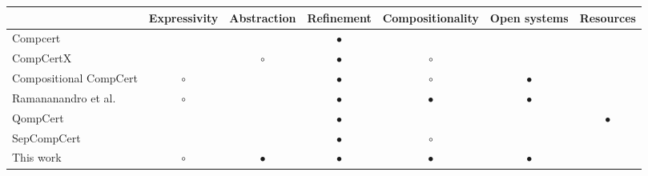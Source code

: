 \documentclass[sigplan,10pt,review,anonymous]{acmart}
\begin{document}
\begin{table*}
  \begin{tabular}{lcccccc}
    \hline
    & Expressivity & Abstraction & Refinement & Compositionality & Open systems & Resources \\
    \hline
    Compcert \cite{compcert}
      &           &           & $\bullet$ &           &           & \\
    CompCertX \cite{popl2015}
      &           & $\circ$   & $\bullet$ & $\circ$   &           & \\
    Compositional CompCert \cite{compcompcert}
      & $\circ$   &           & $\bullet$ & $\circ$   & $\bullet$ & \\
    Ramananandro et al. \cite{cpp2015}
      & $\circ$   &           & $\bullet$ & $\bullet$ & $\bullet$ & \\
    QompCert \cite{qompcert}
      &           &           & $\bullet$ &           &           & $\bullet$ \\
    SepCompCert \cite{lwsc}
      &           &           & $\bullet$ & $\circ$   &           & \\
    This work
      & $\circ$   & $\bullet$ & $\bullet$ & $\bullet$ & $\bullet$ & \\
    \hline
  \end{tabular}
\end{table*}



\end{document}
